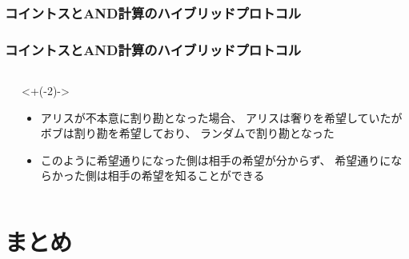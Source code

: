 \begin{frame}
  \tableofcontents[currentsection]
\end{frame}

\begin{frame}
  \frametitle{コイントスとAND計算のハイブリッドプロトコル}


  \pause
\end{frame}

\begin{frame}
  \frametitle{コイントスとAND計算のハイブリッドプロトコル}

  \begin{columns}
    \begin{column}{0.6\textwidth}

    \end{column}
    \begin{column}{0.4\textwidth}
      \uncover<+(-2)->{
        \begin{itemize}
          \item アリスが不本意に割り勘となった場合、
          アリスは奢りを希望していたがボブは割り勘を希望しており、
          ランダムで割り勘となった

          \item<2-> このように希望通りになった側は相手の希望が分からず、
          希望通りにならかった側は相手の希望を知ることができる
        \end{itemize}
      }
    \end{column}
  \end{columns}
\end{frame}

\section{まとめ}

